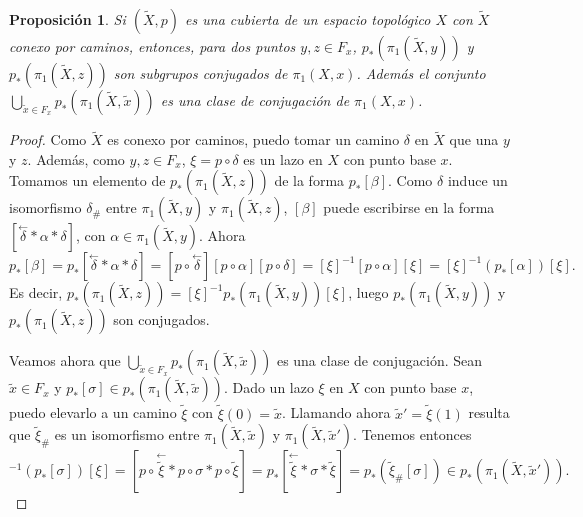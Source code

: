 \documentclass[12pt,a4paper]{book}
\newtheorem{prop}[thm]{Proposición}
\theoremstyle{definition} \newtheorem{defn}[thm]{Definición}
\theoremstyle{definition} \newtheorem{ejemplo}[thm]{Ejemplo}
\theoremstyle{definition} \newtheorem{ejercicio}[thm]{Ejercicio}
\theoremstyle{remark} \newtheorem*{obs}{Observación}
\def\gf{\pi_1}
\def\XX{\tilde{X}}
\def\xx{\tilde{x}}
\newcommand\cev[1]{\overset{\leftarrow}{#1}}
\begin{document}
\begin{prop}
  Si $(\XX,p)$ es una cubierta de un espacio topológico $X$ con $\XX$ conexo por caminos, entonces, para dos puntos $y,z\in F_x$, $p_*(\gf(\XX,y))$ y $p_*(\gf(\XX,z))$ son subgrupos conjugados de $\gf(X,x)$. Además el conjunto $\bigcup_{\xx \in F_x} p_*(\gf(\XX,\xx))$ es una clase de conjugación de $\gf(X,x)$.
\end{prop}
\begin{proof}
  Como $\XX$ es conexo por caminos, puedo tomar un camino $\delta$ en $\XX$ que una $y$ y $z$. Además, como $y,z\in F_x$, $\xi=p\circ \delta$ es un lazo en $X$ con punto base $x$. Tomamos un elemento de $p_*(\gf(\XX,z))$ de la forma $p_*[\beta]$. Como $\delta$ induce un isomorfismo $\delta_\#$ entre $\gf(\XX,y)$ y $\gf(\XX,z)$, $[\beta]$ puede escribirse en la forma $[\cev{\delta}*\alpha*\delta]$, con $\alpha \in \gf(\XX,y)$. Ahora
  \begin{equation*}
    p_*[\beta]=p_*[\cev{\delta}*\alpha*\delta]=[p\circ\cev{\delta}][p\circ\alpha][p\circ\delta]=[\xi]^{-1}[p\circ\alpha][\xi]=[\xi]^{-1}(p_*[\alpha])[\xi].
  \end{equation*}
Es decir, $p_*(\gf(\XX,z))=[\xi]^{-1}p_*(\gf(\XX,y))[\xi]$, luego $p_*(\gf(\XX,y))$ y $p_*(\gf(\XX,z))$ son conjugados.

Veamos ahora que $\bigcup_{\xx \in F_x} p_*(\gf(\XX,\xx))$ es una clase de conjugación. Sean $\xx \in F_x$ y $p_*[\sigma]\in p_*(\gf(\XX,\xx))$. Dado un lazo $\xi$ en $X$ con punto base $x$, puedo elevarlo a un camino $\tilde{\xi}$ con $\tilde{\xi}(0)=\xx$. Llamando ahora $\xx'=\tilde{\xi}(1)$ resulta que $\tilde{\xi}_{\#}$ es un isomorfismo entre $\gf(\XX,\xx)$ y $\gf(\XX,\xx')$. Tenemos entonces
\begin{equation*}
  [\xi]^{-1}(p_*[\sigma])[\xi]=[p\circ \cev{\tilde{\xi}} * p\circ \sigma * p\circ \tilde{\xi}]=p_*[\cev{\tilde{\xi}}*\sigma*\tilde{\xi}]=p_*(\tilde{\xi}_{\#}[\sigma])\in p_*(\gf(\XX,\xx')).
\end{equation*}
\end{proof}
\end{document}

